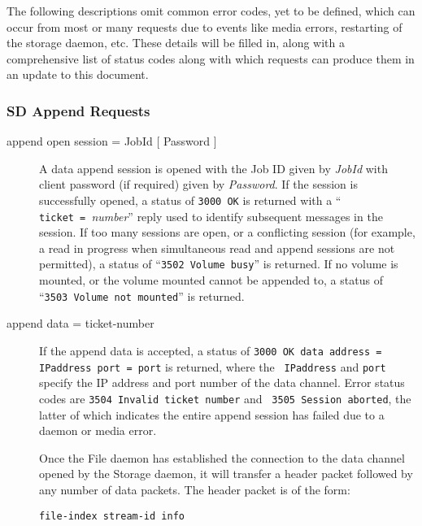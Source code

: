 The following descriptions omit common error codes, yet to be defined, which
can occur from most or many requests due to events like media errors,
restarting of the storage daemon, etc. These details will be filled in, along
with a comprehensive list of status codes along with which requests can
produce them in an update to this document. 

\subsubsection*{SD Append Requests}

\begin{description}

\item [{append open session = \lt{}JobId\gt{} [  \lt{}Password\gt{} ]  }]
   A data append session is opened with the Job ID given by  {\it JobId} with
client password (if required) given by {\it Password}.  If the session is
successfully opened, a status of {\tt 3000\ OK} is  returned with a ``{\tt
ticket\ =\ }{\it number}'' reply used to  identify subsequent messages in the
session. If too many sessions are open, or  a conflicting session (for
example, a read in progress when simultaneous read  and append sessions are
not permitted), a status of  ``{\tt 3502\ Volume\ busy}'' is returned. If no
volume is mounted, or  the volume mounted cannot be appended to, a status of 
``{\tt 3503\ Volume\ not\ mounted}'' is returned.  

\item [append data = \lt{}ticket-number\gt{}  ]
   If the append data is accepted, a  status of {\tt 3000\ OK data address =
\lt{}IPaddress\gt{} port = \lt{}port\gt{}} is returned,  where the {\tt
IPaddress} and {\tt port} specify the IP address and  port number of the data
channel. Error status codes are  {\tt 3504\ Invalid\ ticket\ number} and  {\tt
3505\ Session\ aborted}, the latter of which indicates the  entire append
session has failed due to a daemon or media error.  

Once the File daemon has established the connection to the data channel 
opened by the Storage daemon, it will transfer a header packet followed  by
any number of data packets. The header packet is of the form:  

{\tt \lt{}file-index\gt{} \lt{}stream-id\gt{} \lt{}info\gt{}}  


\end{description}
